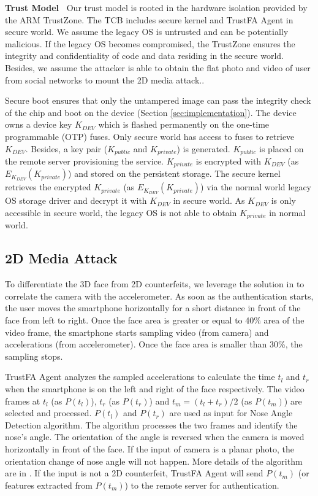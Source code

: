 \noindent
{\bf Trust Model~}
Our trust model is rooted in the hardware isolation provided by the ARM
TrustZone. The TCB includes secure kernel and TrustFA Agent in secure world. We
assume the legacy OS is untrusted and can be potentially malicious. If the
legacy OS becomes compromised, the TrustZone ensures the integrity and
confidentiality of code and data residing in the secure world. Besides, we
assume the attacker is able to obtain the flat photo and video of user from social
networks to mount the 2D media attack..

Secure boot ensures that only the untampered image can pass the integrity check
of the chip and boot on the device (Section \ref{sec:implementation}).  The
device owns a device key $K_{DEV}$ which is flashed permanently on the one-time
programmable (OTP) fuses. Only secure world has access to fuses to retrieve
$K_{DEV}$. Besides, a key pair ($K_{public}$ and $K_{private}$) is generated.  $K_{public}$ is placed on the remote server provisioning the
service. $K_{private}$ is encrypted with $K_{DEV}$ (as
$E_{K_{DEV}}{(K_{private})}$) and stored on the persistent storage. The secure
kernel retrieves the encrypted $K_{private}$ (as $E_{K_{DEV}}{(K_{private})}$) via
the normal world legacy OS storage driver and decrypt it with $K_{DEV}$ in
secure world. As $K_{DEV}$ is only accessible in secure world, the legacy OS is
not able to obtain $K_{private}$ in normal world. 

\subsection{2D Media Attack}
\label{sec:design:phase1}

To differentiate the 3D face from 2D counterfeits, we leverage the solution in
\cite{Chen-Sensor} to correlate the camera with the accelerometer. As soon as
the authentication starts, the user moves the smartphone horizontally for a
short distance in front of the face from left to right. Once the face area is
greater or equal to 40\% area of the video frame, the smartphone starts sampling
video (from camera) and accelerations (from accelerometer). Once the face area
is smaller than 30\%, the sampling stops.

TrustFA Agent analyzes the sampled accelerations to calculate the time $t_l$ and
$t_r$ when the smartphone is on the left and right of the face respectively. The
video frames at $t_l$ (as $P(t_l)$), $t_r$ (as $P(t_r)$) and $t_m=(t_l+t_r)/2$
(as $P(t_m)$) are selected and processed. $P(t_l)$ and $P(t_r)$ are used as
input for Nose Angle Detection algorithm. The algorithm processes the two frames
and identify the nose's angle. The orientation of the angle is reversed when the
camera is moved horizontally in front of the face. If the input of camera is a
planar photo, the orientation change of nose angle will not happen. More details
of the algorithm are in \cite{Chen-Sensor}. If the input is not a 2D
counterfeit, TrustFA Agent will send $P(t_m)$ (or features extracted from $P(t_m)$) to the
remote server for authentication.

